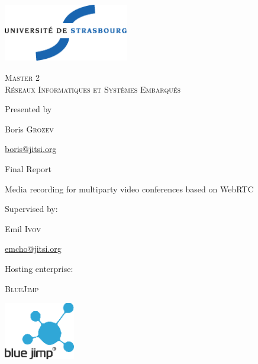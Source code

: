 \thispagestyle{empty}

\begin{center}
       \noindent
       \includegraphics[height=2.5cm]{./pics/uds.eps}       
       
       \vfill\vfill

    {\large \textsc{Master 2\\Réseaux Informatiques et Systèmes Embarqués}}

    \bigskip\bigskip

    {\large Presented by}

    \medskip

    {\large Boris \textsc{Grozev}}
 
    {\small \url{boris@jitsi.org}}

    \vfill\vfill

    {\huge \sc
      \begin{center}
		Final Report
      \end{center}}
        \begin{center}
        Media recording for multiparty video conferences based on WebRTC %
        \end{center}

    \vfill\vfill

    {\large Supervised by:}

\medskip

    {\large Emil \textsc{Ivov}}

    {\small \url{emcho@jitsi.org}}

\bigskip

    {\large Hosting enterprise:} %

\medskip

    {\large \textsc{BlueJimp}}

\vfill\vfill\vfill
           
       \includegraphics[height=2.5cm]{./pics/bluejimp2.eps}

\end{center}
